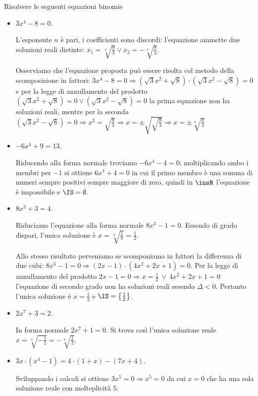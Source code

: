 \begin{exrig}
 \begin{esempio}
Risolvere le seguenti equazioni binomie
\begin{itemize}
\item $3x^4-8=0$.

L’esponente $n$ è pari, i coefficienti sono discordi: l’equazione ammette due soluzioni reali distinte: $x_1=\sqrt[4]{\frac 8 3}\vee x_2=-\sqrt[4]{\frac 8 3}$.

Osserviamo che l’equazione proposta può essere risolta col metodo della scomposizione in fattori: $3x^4-8=0 \Rightarrow \left(\sqrt 3x^2+\sqrt 8\right)\cdot \left(\sqrt 3x^2-\sqrt 8\right)=0$ e per la legge di annullamento del prodotto $\left(\sqrt 3x^2+\sqrt 8\right)=0\vee \left(\sqrt 3x^2-\sqrt 8\right)=0$ la prima equazione non ha soluzioni reali, mentre per la seconda $\left(\sqrt 3x^2-\sqrt 8\right)=0\Rightarrow x^2=\sqrt{\frac 8 3}\Rightarrow x=\pm \sqrt{\sqrt{\frac 8 3}}\Rightarrow x=\pm \sqrt[4]{\frac 8 3}$

\item $-6x^4+9=13$.

Riducendo alla forma normale troviamo $-6x^4-4=0$; moltiplicando ambo i membri per $-1$ si ottiene $6x^4+4=0$ in cui il primo membro è una somma di numeri sempre positivi sempre maggiore di zero, quindi in $\insR$ l’equazione è impossibile e $\IS=\emptyset $.

\item $8x^3+3=4$.

Riduciamo l’equazione alla forma normale $8x^3-1=0$. Essendo di grado dispari, l’unica soluzione è $x=\sqrt[3]{\frac 1 8}=\frac 1 2$.

Allo stesso risultato perveniamo se scomponiamo in fattori la differenza di due cubi: $8x^3-1=0 \Rightarrow (2x-1)\cdot \left(4x^2+2x+1\right)=0$. Per la legge di annullamento del prodotto $2x-1=0 \Rightarrow x=\frac 1 2\ \vee \ 4x^2+2x+1=0$ l'equazione di secondo grado non ha soluzioni reali essendo $\Delta <0$. Pertanto l'unica soluzione è $x=\frac 1 2$ e $\IS=\left\{\frac 1 2\right\}$.

\item $ 2x^7+3=2 $.

In forma normale $2x^7+1=0$. Si trova così l’unica soluzione reale $x=\sqrt[7]{-\frac 1 2}=-\sqrt[7]{\frac 1 2}$.

\item $3x\cdot \left(x^4-1\right)=4\cdot (1+x)-(7x+4)$.

Sviluppando i calcoli si ottiene $3x^5=0 \Rightarrow x^5=0$ da cui $x=0$ che ha una sola soluzione reale con molteplicità $5$.


\end{itemize}
\end{esempio}
\end{exrig}
